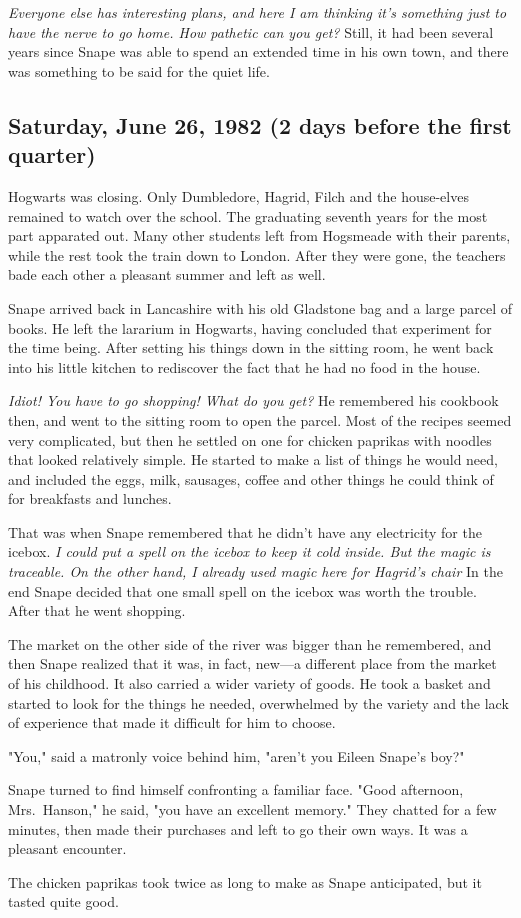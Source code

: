 \emph{Everyone else has interesting plans, and here I am thinking it's something just to have the nerve to go home. How pathetic can you get?} Still, it had been several years since Snape was able to spend an extended time in his own town, and there was something to be said for the quiet life.

\subsection{Saturday, June 26, 1982 (2 days before the first quarter)}

Hogwarts was closing. Only Dumbledore, Hagrid, Filch and the house-elves remained to watch over the school. The graduating seventh years for the most part apparated out. Many other students left from Hogsmeade with their parents, while the rest took the train down to London. After they were gone, the teachers bade each other a pleasant summer and left as well.

Snape arrived back in Lancashire with his old Gladstone bag and a large parcel of books. He left the lararium in Hogwarts, having concluded that experiment for the time being. After setting his things down in the sitting room, he went back into his little kitchen to rediscover the fact that he had no food in the house.

\emph{Idiot! You have to go shopping! What do you get?} He remembered his cookbook then, and went to the sitting room to open the parcel. Most of the recipes seemed very complicated, but then he settled on one for chicken paprikas with noodles that looked relatively simple. He started to make a list of things he would need, and included the eggs, milk, sausages, coffee and other things he could think of for breakfasts and lunches.

That was when Snape remembered that he didn't have any electricity for the icebox. \emph{I could put a spell on the icebox to keep it cold inside. But the magic is traceable. On the other hand, I already used magic here for Hagrid's chair{\el}} In the end Snape decided that one small spell on the icebox was worth the trouble. After that he went shopping.

The market on the other side of the river was bigger than he remembered, and then Snape realized that it was, in fact, new—a different place from the market of his childhood. It also carried a wider variety of goods. He took a basket and started to look for the things he needed, overwhelmed by the variety and the lack of experience that made it difficult for him to choose.

"You," said a matronly voice behind him, "aren't you Eileen Snape's boy?"

Snape turned to find himself confronting a familiar face. "Good afternoon, Mrs.~Hanson," he said, "you have an excellent memory." They chatted for a few minutes, then made their purchases and left to go their own ways. It was a pleasant encounter.

The chicken paprikas took twice as long to make as Snape anticipated, but it tasted quite good.


